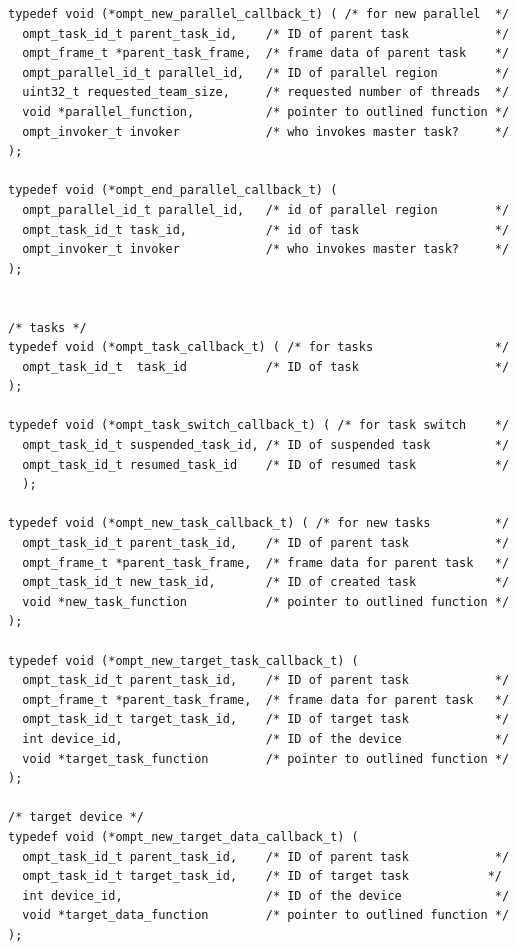 \documentclass{article}
\begin{document}
{\begin{verbatim}
typedef void (*ompt_new_parallel_callback_t) ( /* for new parallel  */
  ompt_task_id_t parent_task_id,    /* ID of parent task            */
  ompt_frame_t *parent_task_frame,  /* frame data of parent task    */
  ompt_parallel_id_t parallel_id,   /* ID of parallel region        */
  uint32_t requested_team_size,     /* requested number of threads  */
  void *parallel_function,          /* pointer to outlined function */
  ompt_invoker_t invoker            /* who invokes master task?     */
);
  
typedef void (*ompt_end_parallel_callback_t) (
  ompt_parallel_id_t parallel_id,   /* id of parallel region        */
  ompt_task_id_t task_id,           /* id of task                   */
  ompt_invoker_t invoker            /* who invokes master task?     */
);
								    
		
/* tasks */						    						    
typedef void (*ompt_task_callback_t) ( /* for tasks                 */	   
  ompt_task_id_t  task_id           /* ID of task                   */
);

typedef void (*ompt_task_switch_callback_t) ( /* for task switch    */			   
  ompt_task_id_t suspended_task_id, /* ID of suspended task         */ 
  ompt_task_id_t resumed_task_id    /* ID of resumed task           */
  );								   

typedef void (*ompt_new_task_callback_t) ( /* for new tasks         */
  ompt_task_id_t parent_task_id,    /* ID of parent task            */
  ompt_frame_t *parent_task_frame,  /* frame data for parent task   */
  ompt_task_id_t new_task_id,       /* ID of created task           */
  void *new_task_function           /* pointer to outlined function */
);
  
typedef void (*ompt_new_target_task_callback_t) (
  ompt_task_id_t parent_task_id,    /* ID of parent task            */
  ompt_frame_t *parent_task_frame,  /* frame data for parent task   */
  ompt_task_id_t target_task_id,    /* ID of target task            */
  int device_id,                    /* ID of the device             */
  void *target_task_function        /* pointer to outlined function */
);

/* target device */
typedef void (*ompt_new_target_data_callback_t) ( 
  ompt_task_id_t parent_task_id,    /* ID of parent task            */
  ompt_task_id_t target_task_id,    /* ID of target task           */
  int device_id,                    /* ID of the device             */
  void *target_data_function        /* pointer to outlined function */
);


\end{verbatim}}
\end{document}
